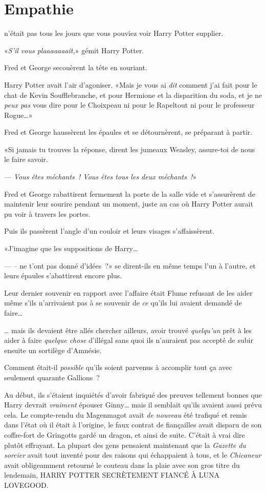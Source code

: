 \chapter{Empathie}

 n'était pas tous les jours que vous pouviez voir Harry Potter supplier.

\hplettrineextrapara
«\emph{S'il vous plaaaaaaaît,}» gémit Harry Potter.

Fred et George secouèrent la tête en souriant.

Harry Potter avait l'air d'agoniser. «Mais je vous ai \emph{dit} comment j'ai fait pour le chat de Kevin Soufflebranche, et pour Hermione et la disparition du soda, et je ne \emph{peux pas} vous dire pour le Choixpeau ni pour le Rapeltout ni pour le professeur Rogue…»

Fred et George haussèrent les épaules et se détournèrent, se préparant à partir.

«Si jamais tu trouves la réponse, dirent les jumeaux Weasley, assure-toi de nous le faire savoir.

--- \emph{Vous êtes méchants~! Vous êtes tous les deux méchants~!}»

Fred et George rabattirent fermement la porte de la salle vide et s'assurèrent de maintenir leur sourire pendant un moment, juste au cas où Harry Potter aurait pu voir à travers les portes.

Puis ils passèrent l'angle d'un couloir et leurs visages s'affaissèrent.

«J'imagine que les suppositions de Harry…

--- -- ne t'ont pas donné d'idées~?» se dirent-ils en même temps l'un à l'autre, et leurs épaules s'abattirent encore plus.

Leur dernier souvenir en rapport avec l'affaire était Flume refusant de les aider même s'ils n'arrivaient pas à se souvenir de \emph{ce} qu'ils lui avaient demandé de faire…

… mais ils devaient être allés chercher ailleurs, avoir trouvé \emph{quelqu'un} prêt à les aider à faire \emph{quelque chose} d'illégal sans quoi ils n'auraient pas accepté de subir ensuite un sortilège d'Amnésie.

Comment était-il \emph{possible} qu'ils soient parvenus à accomplir tout ça avec seulement quarante Gallions~?

Au début, ils s'étaient inquiétés d'avoir fabriqué des preuves tellement bonnes que Harry devrait \emph{vraiment} épouser Ginny… mais il semblait qu'ils avaient aussi prévu cela. Le compte-rendu du Magenmagot avait \emph{de nouveau} été trafiqué et remis dans l'état où il était à l'origine, le faux contrat de fiançailles avait disparu de son coffre-fort de Gringotts gardé un dragon, et ainsi de suite. C'était à vrai dire plutôt effrayant. La plupart des gens pensaient maintenant que la \emph{Gazette du sorcier} avait tout inventé pour des raisons qui échappaient à tous, et le \emph{Chicaneur} avait obligeamment retourné le couteau dans la plaie avec son gros titre du lendemain, HARRY POTTER SECRÈTEMENT FIANCÉ À LUNA LOVEGOOD.

